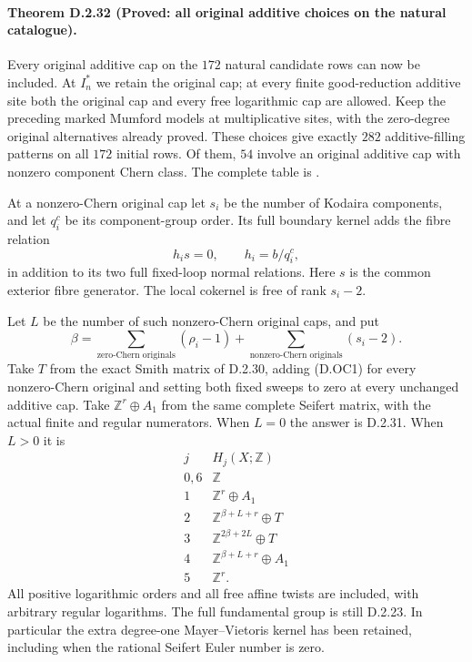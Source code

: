 \paragraph{Theorem D.2.32 (Proved: all original additive choices on the natural catalogue).}
Every original additive cap on the $172$ natural candidate
rows can now be included. At $I_n^*$ we retain the original
cap; at every finite good-reduction additive site both the
original cap and every free logarithmic cap are allowed.
Keep the preceding marked Mumford models at multiplicative
sites, with the zero-degree original alternatives already
proved. These choices give exactly $282$ additive-filling
patterns on all $172$ initial rows. Of them, $54$ involve an
original additive cap with nonzero component Chern class.
The complete table is
.

At a nonzero-Chern original cap let $s_i$ be the number of
Kodaira components, and let $q_i^c$ be its component-group
order. Its full boundary kernel adds the fibre relation
\[
 h_i s=0,\qquad h_i=b/q_i^c,                               \tag{D.OC1}
\]
in addition to its two full fixed-loop normal relations.
Here $s$ is the common exterior fibre generator.
The local cokernel is free of rank $s_i-2$.

Let $L$ be the number of such nonzero-Chern original caps,
and put
\[
 \beta=
 \sum_{\text{zero-Chern originals}}(\rho_i-1)
 +\sum_{\text{nonzero-Chern originals}}(s_i-2).
                                                               \tag{D.OC2}
\]
Take $T$ from the exact Smith matrix of D.2.30, adding
(D.OC1) for every nonzero-Chern original and setting both
fixed sweeps to zero at every unchanged additive cap.
Take $\mathbb Z^r\oplus A_1$ from the same complete Seifert
matrix, with the actual finite and regular numerators.
When $L=0$ the answer is D.2.31. When $L>0$ it is
\[
\begin{array}{c|c}
j&H_j(X;\mathbb Z)\\\hline
0,6&\mathbb Z\\
1&\mathbb Z^r\oplus A_1\\
2&\mathbb Z^{\beta+L+r}\oplus T\\
3&\mathbb Z^{2\beta+2L}\oplus T\\
4&\mathbb Z^{\beta+L+r}\oplus A_1\\
5&\mathbb Z^r.
\end{array}                                                   \tag{D.OC3}
\]
All positive logarithmic orders and all free affine twists
are included, with arbitrary regular logarithms. The full
fundamental group is still D.2.23. In particular the extra
degree-one Mayer--Vietoris kernel has been retained, including
when the rational Seifert Euler number is zero.


